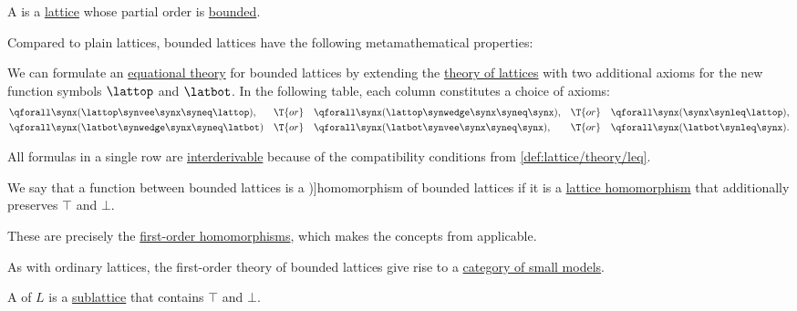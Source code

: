 \begin{definition}\label{def:bounded_lattice}
  A  is a \hyperref[def:lattice]{lattice} whose partial order is \hyperref[def:extremal_points/bounds]{bounded}.

  Compared to plain lattices, bounded lattices have the following metamathematical properties:
  \begin{thmenum}
    \mimprovised We can formulate an \hyperref[def:fol_equational_theory]{equational theory} for bounded lattices by extending the \hyperref[def:lattice/theory]{theory of lattices} with two additional axioms for the new function symbols \( \lattop \) and \( \latbot \). In the following table, each column constitutes a choice of axioms:
    \begin{align}
      &\qforall \synx (\lattop \synvee \synx \syneq \lattop),  && \T{or} &&\qforall \synx (\lattop \synwedge \synx \syneq \synx), && \T{or} &&\qforall \synx (\synx \synleq \lattop), \label{eq:def:bounded_lattice/theory/top} \\
      &\qforall \synx (\latbot \synwedge \synx \syneq \latbot) && \T{or} &&\qforall \synx (\latbot \synvee \synx \syneq \synx),   && \T{or} &&\qforall \synx (\latbot \synleq \synx). \label{eq:def:bounded_lattice/theory/bot}
    \end{align}

    All formulas in a single row are \hyperref[def:interderivability]{interderivable} because of the compatibility conditions from \cref{def:lattice/theory/leq}.

     We say that a function between bounded lattices is a \term[en=\( \set{0, 1} \)-homomorphism (\cite[\S 2.17]{DaveyPriestley2002LatticeTheory})]{homomorphism of bounded lattices} if it is a \hyperref[def:lattice/morphism]{lattice homomorphism} that additionally preserves \( \top \) and \( \bot \).

    These are precisely the \hyperref[def:fol_homomorphism]{first-order homomorphisms}, which makes the concepts from  applicable.

    \mimprovised As with ordinary lattices, the first-order theory of bounded lattices give rise to a \hyperref[def:fol_theory_model_functor/obj]{category of small models}.

    \mimprovised A  of \( L \) is a \hyperref[def:lattice/subobject]{sublattice} that contains \( \top \) and \( \bot \).


\end{thmenum}
\end{definition}
